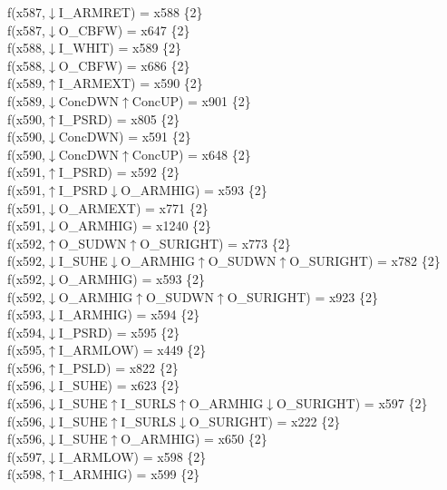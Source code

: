 f(x587,$\downarrow$I\_ARMRET) = x588 \{2\} \\  
f(x587,$\downarrow$O\_CBFW) = x647 \{2\} \\  
f(x588,$\downarrow$I\_WHIT) = x589 \{2\} \\  
f(x588,$\downarrow$O\_CBFW) = x686 \{2\} \\  
f(x589,$\uparrow$I\_ARMEXT) = x590 \{2\} \\  
f(x589,$\downarrow$ConcDWN$\uparrow$ConcUP) = x901 \{2\} \\  
f(x590,$\uparrow$I\_PSRD) = x805 \{2\} \\  
f(x590,$\downarrow$ConcDWN) = x591 \{2\} \\  
f(x590,$\downarrow$ConcDWN$\uparrow$ConcUP) = x648 \{2\} \\  
f(x591,$\uparrow$I\_PSRD) = x592 \{2\} \\  
f(x591,$\uparrow$I\_PSRD$\downarrow$O\_ARMHIG) = x593 \{2\} \\  
f(x591,$\downarrow$O\_ARMEXT) = x771 \{2\} \\  
f(x591,$\downarrow$O\_ARMHIG) = x1240 \{2\} \\  
f(x592,$\uparrow$O\_SUDWN$\uparrow$O\_SURIGHT) = x773 \{2\} \\  
f(x592,$\downarrow$I\_SUHE$\downarrow$O\_ARMHIG$\uparrow$O\_SUDWN$\uparrow$O\_SURIGHT) = x782 \{2\} \\  
f(x592,$\downarrow$O\_ARMHIG) = x593 \{2\} \\  
f(x592,$\downarrow$O\_ARMHIG$\uparrow$O\_SUDWN$\uparrow$O\_SURIGHT) = x923 \{2\} \\  
f(x593,$\downarrow$I\_ARMHIG) = x594 \{2\} \\  
f(x594,$\downarrow$I\_PSRD) = x595 \{2\} \\  
f(x595,$\uparrow$I\_ARMLOW) = x449 \{2\} \\  
f(x596,$\uparrow$I\_PSLD) = x822 \{2\} \\  
f(x596,$\downarrow$I\_SUHE) = x623 \{2\} \\  
f(x596,$\downarrow$I\_SUHE$\uparrow$I\_SURLS$\uparrow$O\_ARMHIG$\downarrow$O\_SURIGHT) = x597 \{2\} \\  
f(x596,$\downarrow$I\_SUHE$\uparrow$I\_SURLS$\downarrow$O\_SURIGHT) = x222 \{2\} \\  
f(x596,$\downarrow$I\_SUHE$\uparrow$O\_ARMHIG) = x650 \{2\} \\  
f(x597,$\downarrow$I\_ARMLOW) = x598 \{2\} \\  
f(x598,$\uparrow$I\_ARMHIG) = x599 \{2\} \\  
